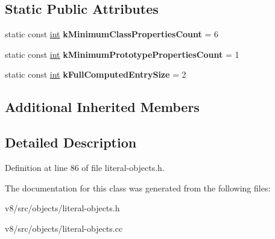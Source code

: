 \subsection*{Static Public Attributes}
\begin{DoxyCompactItemize}
\item 
\mbox{\label{classv8_1_1internal_1_1ClassBoilerplate_a3cb247fe842669c83c2b3f587497bbc8}} 
static const \mbox{\hyperlink{classint}{int}} {\bfseries k\+Minimum\+Class\+Properties\+Count} = 6
\item 
\mbox{\label{classv8_1_1internal_1_1ClassBoilerplate_a2601877e0de901316eac55dbbaf37212}} 
static const \mbox{\hyperlink{classint}{int}} {\bfseries k\+Minimum\+Prototype\+Properties\+Count} = 1
\item 
\mbox{\label{classv8_1_1internal_1_1ClassBoilerplate_a63bd245f558c454fdc595643c6f5b79e}} 
static const \mbox{\hyperlink{classint}{int}} {\bfseries k\+Full\+Computed\+Entry\+Size} = 2
\end{DoxyCompactItemize}
\subsection*{Additional Inherited Members}


\subsection{Detailed Description}


Definition at line 86 of file literal-\/objects.\+h.



The documentation for this class was generated from the following files\+:\begin{DoxyCompactItemize}
\item 
v8/src/objects/literal-\/objects.\+h\item 
v8/src/objects/literal-\/objects.\+cc\end{DoxyCompactItemize}
